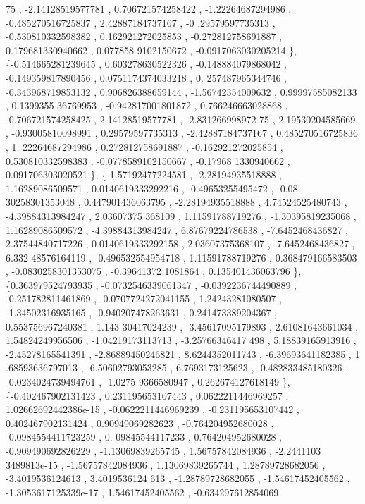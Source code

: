 \begin{DoxyCode}
      75 , -2.14128519577781 , 0.706721574258422 , -1.22264687294986 , -0.485270516725837 ,  2.42887184737167 , -0
      .29579597735313 , -0.530810332598382 , 0.162921272025853 , -0.272812758691887 , 0.179681330940662 , 0.077858
      9102150672 , -0.0917063030205214 \},
\{-0.514665281239645 , 0.603278630522326 , -0.148884079868042 , -0.149359817890456 , 0.0751174374033218 , 0.
      257487965344746 , -0.343968719853132 , 0.906826388659144 , -1.56742354009632 ,  0.99997585082133 , 0.1399355
      36769953 , -0.942817001801872 , 0.766246663028868 , -0.706721574258425 ,  2.14128519577781 , -2.831266998972
      75 ,  2.19530204585669 , -0.93005810098991 ,  0.29579597735313 , -2.42887184737167 , 0.485270516725836 ,  1.
      22264687294986 , 0.272812758691887 , -0.162921272025854 , 0.530810332598383 , -0.0778589102150667 , -0.17968
      1330940662 , 0.091706303020521 \},
\{ 1.57192477224581 , -2.28194935518888 ,  1.16289086509571 , 0.0140619333292216 , -0.49653255495472 , -0.08
      30258301353048 , 0.447901436063795 , -2.28194935518888 ,  4.74524525480743 , -4.39884313984247 ,  2.03607375
      368109 ,  1.11591788719276 , -1.30395819235068 ,  1.16289086509572 , -4.39884313984247 ,  6.87679224786538 ,
        -7.6452468436827 ,  2.37544840717226 , 0.0140619333292158 ,  2.03607375368107 ,  -7.6452468436827 ,  6.332
      48576164119 , -0.496532554954718 ,  1.11591788719276 , 0.368479166583503 , -0.0830258301353075 , -0.39641372
      1081864 , 0.135401436063796 \},
\{0.363979524793935 , -0.0732546339061347 , -0.0392236744490889 , -0.251782811461869 , -0.0707724272041155 ,
        1.24243281080507 , -1.34502316935165 , -0.940207478263631 , 0.241473389204367 , 0.553756967240381 ,  1.143
      30417024239 , -3.45617095179893 ,  2.61081643661034 ,  1.54824249956506 , -1.04219173113713 , -3.25766346417
      498 ,  5.18839165913916 , -2.45278165541391 , -2.86889450246821 ,   8.6244352011743 , -6.39693641182385 ,  1
      .68593636797013 , -6.50602793053285 ,   6.7693173125623 , -0.482833485180326 , -0.0234024739494761 , -1.0275
      9366580947 , 0.262674127618149 \},
\{-0.402467902131423 , 0.231195653107443 , 0.0622211446969257 , 1.02662692442386e-15 , -0.0622211446969239 ,
       -0.231195653107442 , 0.402467902131424 ,  0.90949069282623 , -0.764204952680028 , -0.0984554411723259 ,  0.
      09845544117233 , 0.764204952680028 , -0.909490692826229 , -1.13069839265745 ,  1.56757842084936 , -2.2441103
      3489813e-15 , -1.56757842084936 ,  1.13069839265744 ,  1.28789728682056 ,  -3.4019536124613 ,   3.4019536124
      613 , -1.28789728682055 , -1.54617452405562 , -1.3053617125339e-17 ,  1.54617452405562 , -0.634297612854069 

\end{DoxyCode}
